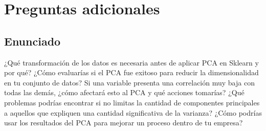 \newpage
\section{Preguntas adicionales}
\subsection{Enunciado}
¿Qué transformación de los datos es necesaria antes de aplicar PCA en Sklearn y por qué? 
¿Cómo evaluarías si el PCA fue exitoso para reducir la dimensionalidad en tu conjunto de datos? 
Si una variable presenta una correlación muy baja con todas las demás, ¿cómo afectará esto al PCA y qué acciones tomarías? 
¿Qué problemas podrías encontrar si no limitas la cantidad de componentes principales a aquellos que expliquen una cantidad significativa de la varianza? 
¿Cómo podrías usar los resultados del PCA para mejorar un proceso dentro de tu empresa? 
